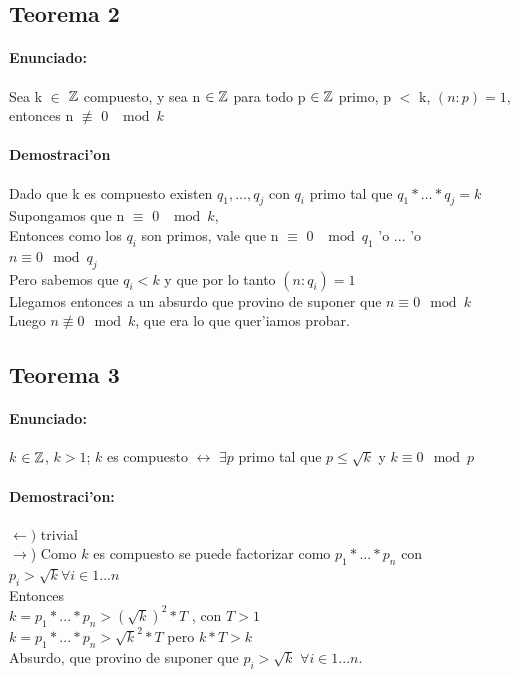 \subsection{Teorema 2}
\paragraph{Enunciado:}
Sea k $\in$ ${\mathbb Z}$ compuesto, y sea n ${\in {\mathbb Z}}$ para todo p ${\in {\mathbb Z}}$ primo, p $<$ k, $(n:p) = 1$, entonces n $\not\equiv$ 0 $\mod{k}$
\paragraph{Demostraci'on}
Dado que k es compuesto existen $q_1,\ldots,q_j$ con $q_i$ primo tal que $q_1*\ldots*q_j = k$ \\
Supongamos que n $\equiv$ 0 $\mod{k}$,\\
Entonces como los $q_i$ son primos, vale que n $\equiv$ 0 $\mod{q_1}$ 'o ... 'o $n \equiv 0 \mod{q_j}$ \\
Pero sabemos que $q_i < k$ y que por lo tanto $(n:q_{i}) = 1$ \\
Llegamos entonces a un absurdo que provino de suponer que  $n \equiv 0 \mod{k}$ \\ 
Luego $n \not\equiv 0 \mod{k}$, que era lo que quer'iamos probar.

\subsection{Teorema 3}
\paragraph{Enunciado:}
$k$ ${\in {\mathbb Z}}$, $k>1$; $k$ es compuesto $\longleftrightarrow$ $\exists p$ primo tal que $p \leq \sqrt{k}$ y $k \equiv 0 \mod{p}$ \\
\paragraph{Demostraci'on:}
$\leftarrow)$ trivial \\
$\rightarrow$) Como $k$ es compuesto se puede factorizar como $p_1*...*p_n$ con $p_i > \sqrt{k} \forall i \in {1...n}$\\
Entonces \\
$k = p_1*...*p_n > (\sqrt{k})^2*T$ , con $T>1$\\  
$k = p_1*...*p_n > \sqrt{k}^2*T$ pero $k*T > k$ \\
Absurdo, que provino de suponer que $p_i > \sqrt{k}$ $\forall i \in {1...n}$.\\

